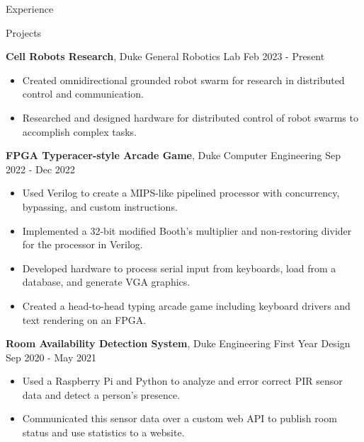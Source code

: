 \documentclass{resume}
\begin{document}
\begin{rSection}{Experience}



\end{rSection} 


\begin{rSection}{Projects}

\textbf{Cell Robots Research}, Duke General Robotics Lab \hfill{Feb 2023 - Present}
\begin{itemize}
    \item Created omnidirectional grounded robot swarm for research in distributed control and communication.
    \item Researched and designed hardware for distributed control of robot swarms to accomplish complex tasks.
\end{itemize}

\textbf{FPGA Typeracer-style Arcade Game}, Duke Computer Engineering \hfill{Sep 2022 - Dec 2022}
\begin{itemize}
    \itemsep -3pt {} 
    \item Used Verilog to create a MIPS-like pipelined processor with concurrency, bypassing, and custom instructions.
    \item Implemented a 32-bit modified Booth's multiplier and non-restoring divider for the processor in Verilog.
    \item Developed hardware to process serial input from keyboards, load from a database, and generate VGA graphics.
    \item Created a head-to-head typing arcade game including keyboard drivers and text rendering on an FPGA.
\end{itemize}

\textbf{Room Availability Detection System}, Duke Engineering First Year Design \hfill{Sep 2020 - May 2021}
\begin{itemize}
    \itemsep -3pt {} 
    \item Used a Raspberry Pi and Python to analyze and error correct PIR sensor data and detect a person's presence.
    \item Communicated this sensor data over a custom web API to publish room status and use statistics to a website.
\end{itemize}

\end{rSection} 
\end{document}
